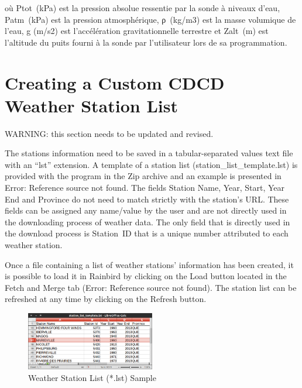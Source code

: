 \documentclass[12pt, letterpaper, fleqn]{report}
\begin{document}
où Ptot (kPa) est la pression absolue ressentie par la sonde à niveaux d'eau, Patm (kPa) est la pression atmosphérique, ρ (kg/m3) est la masse volumique de l'eau, g (m/s2) est l'accélération gravitationnelle terrestre et Zalt (m) est l'altitude du puits fourni à la sonde par l'utilisateur lors de sa programmation.


\appendix

\chapter{Creating a Custom CDCD Weather Station List}
\label{app:custom_station_list}

WARNING: this section needs to be updated and revised.

The stations information need to be saved in a tabular-separated values text file with an “lst” extension. A template of a station list (station\_list\_template.lst) is provided with the program in the Zip archive and an example is presented in Error: Reference source not found. The fields Station Name, Year, Start, Year End and Province do not need to match strictly with the station's URL. These fields can be assigned any name/value by the user and are not directly used in the downloading process of weather data. The only field that is directly used in the download process is Station ID that is a unique number attributed to each weather station.

Once a file containing a list of weather stations' information has been created, it is possible to load it in Rainbird by clicking on the  Load button located in the Fetch and Merge tab (Error: Reference source not found). The station list can be refreshed at any time by clicking on the  Refresh button.

\begin{figure}[h!]
\centering
\includegraphics[width=0.5\textwidth]{img/example_staList}
\caption[Weather Station List (*.lst) Sample]{Weather Station List (*.lst) Sample}
\label{fig:example_staList}
\end{figure}
\end{document}
